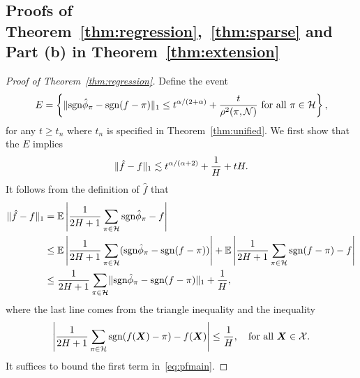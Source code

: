 \documentclass[11pt]{article}
\theoremstyle{plain}
\theoremstyle{definition}
\def\sign{\textup{sgn}}
\begin{document}
\subsection{Proofs of Theorem~\ref{thm:regression},~\ref{thm:sparse} and Part (b) in  Theorem~\ref{thm:extension}}\label{sec:regression}
\begin{proof}[Proof of Theorem~\ref{thm:regression}]
Define the event
\[
E=\left\{\onenormSize{}{\sign \hat \phi_\pi- \sign (f-\pi)} \leq t^{\alpha/(2+\alpha)}+{t\over \rho^2(\pi,\tN)} \text{ for all }\pi\in\tH\right\},
\]
for any $t\geq t_n$ where $t_n$ is specified in Theorem~\ref{thm:unified}.
We first show that the $E$ implies
\begin{align}\label{eq:mb}
\lVert\hat f-f\rVert_1\lesssim t^{\alpha/(\alpha+2)}+{1\over H}+tH.
\end{align} 
It follows from the definition of $\hat f$ that
\begin{align}\label{eq:pfmain}
\onenormSize{}{\hat f-f}&=\mathbb{E}\left|{1\over 2H+1} \sum_{\pi\in \tH}\sign \hat \phi_\pi - f\right|\notag\\
&\leq \mathbb{E}\left|{1\over 2H+1}\sum_{\pi \in \tH} (\sign \hat \phi_\pi - \sign (f-\pi)) \right| +\mathbb{E}\left|{1\over 2H+1}\sum_{\pi \in \tH}\sign(f-\pi)-f\right|\notag\\
& \leq{1\over 2H+1}\sum_{\pi \in \tH}\onenormSize{}{\sign \hat \phi_\pi - \sign (f-\pi)}+{1\over H},
\end{align}
where the last line comes from the triangle inequality and the inequality
\[
\left|{1\over 2H+1}\sum_{\pi \in \tH}\sign(f(\mX)-\pi)-f(\mX)\right|\leq {1\over H}, \quad \text{for all } \mX\in\tX.
\]
It suffices to bound the first term in~\eqref{eq:pfmain}. 




\end{proof}
\end{document}
